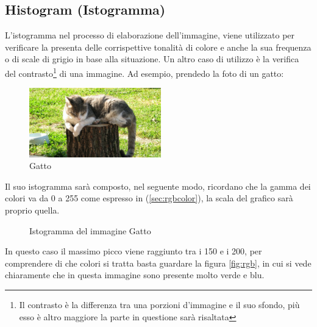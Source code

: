 \documentclass{report}
\begin{document}
\subsection{Histogram (Istogramma)}
\label{sec:histogram}
L'istogramma nel processo di elaborazione dell'immagine, viene utilizzato
per verificare la presenta delle corrispettive tonalità di colore e
anche la sua frequenza o di scale di grigio in base alla situazione.
Un altro caso di utilizzo è la verifica del contrasto\footnote{Il
  contrasto è la differenza tra una porzioni d'immagine e il suo
sfondo, più esso è altro maggiore la parte in questione sarà risaltata}
di una immagine. Ad esempio, prendedo la foto di un gatto:
\begin{figure}[ht!]
  \centering
  \includegraphics[height=3cm]{img/gatto.jpg}
  \caption{Gatto}
  \label{fig:gatto}
\end{figure}

Il suo istogramma sarà composto, nel seguente modo, ricordano che la
gamma dei colori va da 0 a 255 come espresso in (\ref{sec:rgbcolor}),
la scala del grafico sarà proprio quella.
\begin{figure}[ht!]
  \centering
  \resizebox{15cm}{!}{
  }
  \caption{Istogramma del immagine Gatto}
  \label{fig:gatto}
\end{figure}

In questo caso il massimo picco viene raggiunto tra i 150 e i 200, per
comprendere di che colori si tratta basta guardare la figura
\ref{fig:rgb}, in cui si vede chiaramente che in questa immagine sono
presente molto verde e blu.
\end{document}
